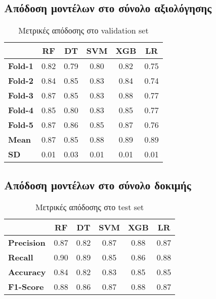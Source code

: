 \documentclass[diploma]{softlab-thesis}
\begin{document}
\begin{enumerate}
\begin{enumerate}
\subsection{Απόδοση μοντέλων στο σύνολο αξιολόγησης}

\begin{table}[H]
\centering
\begin{tabular}{|l|c|c|c|c|c|}\hline
                & \textbf{RF} & \textbf{DT} & \textbf{SVM} & \textbf{XGB} & \textbf{LR} \\ \hline
\textbf{Fold-1} &    0.82         &     0.79        &    0.80          &    0.82          &     0.75        \\ \hline
\textbf{Fold-2} &     0.84        &       0.85      &     0.83         &       0.84       &     0.74        \\ \hline
\textbf{Fold-3} &     0.87        &      0.85       &        0.83     &    0.88         &     0.77        \\ \hline
\textbf{Fold-4} &     0.85        &     0.80        &      0.83        &     0.85         &    0.77         \\ \hline
\textbf{Fold-5} &     0.87        &         0.86    &      0.85       &        0.87     &       0.76      \\ \hline
\textbf{Mean}   &      0.87      &      0.85      &      0.88        &       0.89       &     0.89        \\ \hline
\textbf{SD}     &     0.01        &     0.03        &     0.01         &        0.01      &    0.01         \\ \hline
\end{tabular}
\caption{Μετρικές απόδοσης στο validation set}
\end{table}

\subsection{Απόδοση μοντέλων στο σύνολο δοκιμής}

\begin{table}[H]
\centering
\begin{tabular}{|l|c|c|c|c|c|}
\hline
       & \textbf{RF} & \textbf{DT} & \textbf{SVM} & \textbf{XGB} & \textbf{LR} \\ \hline
\textbf{Precision} & 0.87        & 0.82       & 0.87         & 0.88         & 0.87       \\ \hline
\textbf{Recall}    & 0.90        & 0.89        & 0.85         & 0.86         & 0.88        \\ \hline
\textbf{Accuracy}  & 0.84        & 0.82        & 0.83         & 0.85         & 0.85 \\ \hline
\textbf{F1-Score}  & 0.88        & 0.86       & 0.87         & 0.88         & 0.87       \\ \hline
\end{tabular}
\caption{Μετρικές απόδοσης στο test set}
\end{table}


\end{enumerate}
\end{enumerate}
\end{document}
